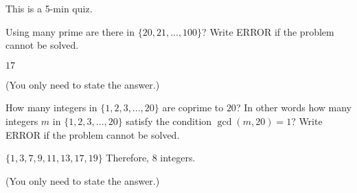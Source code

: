 

\renewcommand\AUTHOR{nweadick@cougars.ccis.edu} %


\topmattertwo

This is a 5-min quiz.

\nextq
Using many prime are there in $\{20, 21, ..., 100\}$?
Write ERROR if the problem cannot be solved.
\\
\ANSWER
\begin{answerlong}
$17$
\end{answerlong}
(You only need to state the answer.)

\nextq
How many integers in $\{1, 2, 3, ..., 20\}$ are coprime to $20$? In other
words how many integers $m$ in $\{1, 2, 3, ..., 20\}$ satisfy the condition
$\gcd(m,20) = 1$?
Write ERROR if the problem cannot be solved.
\\
\ANSWER
\begin{answerlong}
$\{1,3,7,9,11,13,17,19\}$ Therefore, 8 integers.
\end{answerlong}
(You only need to state the answer.)

\newpage


